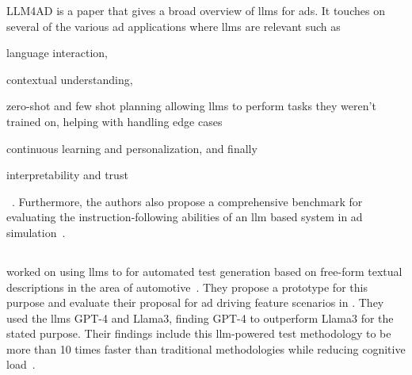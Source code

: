 LLM4AD is a paper that gives a broad overview of \acrshort{llms} for \acrlong{ads}. It touches on
several of the various \acrshort{ad} applications where \acrshort{llms} are relevant such as
\begin{inparaenum}
    \item language interaction,
    \item contextual understanding,
    \item zero-shot and few shot planning allowing \acrshort{llms} to perform tasks they weren't trained
    on, helping with handling edge cases
    \item continuous learning and personalization, and finally
    \item interpretability and trust \end{inparaenum}~\cite[2]{LLM4AD}. Furthermore, the authors
also propose a comprehensive benchmark for evaluating the instruction-following abilities of an
\acrshort{llm} based system in \acrshort{ad} simulation~\cite[1]{LLM4AD}.

\subsection{}

\citeauthor{LLMDrivenTestingADS24} worked on using \acrshort{llms} to for automated test generation
based on free-form textual descriptions in the area of automotive~\cite[173]{LLMDrivenTestingADS24}.
They propose a prototype for this purpose and evaluate their proposal for \acrshort{ad} driving
feature scenarios in \carla. They used the \acrshort{llms} GPT-4 and Llama3, finding GPT-4 to
outperform Llama3 for the stated purpose. Their findings include this \acrshort{llm}-powered test
methodology to be more than \num{10} times faster than traditional methodologies while reducing
cognitive load~\cite[173]{LLMDrivenTestingADS24}.

\subsection{}

